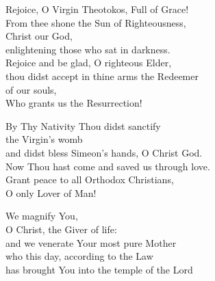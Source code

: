 \documentclass{article}
\begin{document}
%
Rejoice, O Virgin Theotokos, Full of Grace! \\ 
From thee shone the Sun of Righteousness,\\
                  \cont  Christ our God, \\
enlightening those who sat in darkness. \\
Rejoice and be glad, O righteous Elder, \\
thou didst accept in thine arms the Redeemer\\
                  \cont of our souls, \\
Who grants us the Resurrection!

By Thy Nativity Thou didst sanctify\\
       \cont the Virgin’s womb \\
and didst bless Simeon’s hands, O Christ God. \\
Now Thou hast come and saved us through love. \\
Grant peace to all Orthodox Christians,  \\
O only Lover of Man!

We magnify You,\\
O Christ, the Giver of life:\\
and we venerate Your most pure Mother\\
who this day, according to the Law\\
has brought You into the temple of the Lord
\end{document}
